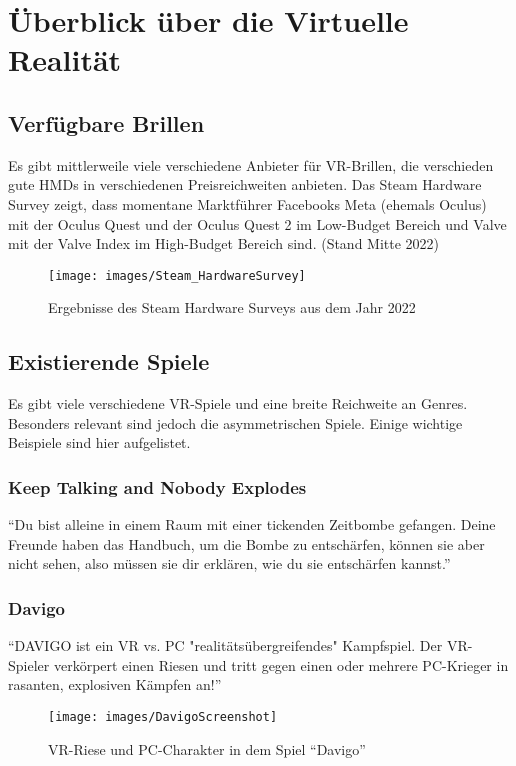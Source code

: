 \chapter{Überblick über die Virtuelle Realität}


\section{Verfügbare Brillen}
Es gibt mittlerweile viele verschiedene Anbieter für VR-Brillen, die verschieden gute HMDs in verschiedenen Preisreichweiten anbieten.
Das Steam Hardware Survey zeigt, dass momentane Marktführer Facebooks Meta (ehemals Oculus) mit der Oculus Quest und der Oculus Quest 2 im Low-Budget Bereich und Valve mit der Valve Index im High-Budget Bereich sind. (Stand Mitte 2022)


\begin{figure}[H]
	\centering
	\texttt{[image: images/Steam\_HardwareSurvey]}
	\caption{Ergebnisse des Steam Hardware Surveys aus dem Jahr 2022\cite{_steam_hardware}}
\end{figure}

\section{Existierende Spiele}
Es gibt viele verschiedene VR-Spiele und eine breite Reichweite an Genres. Besonders relevant sind jedoch die asymmetrischen Spiele. Einige wichtige Beispiele sind hier aufgelistet.

\subsection{Keep Talking and Nobody Explodes}
"`Du bist alleine in einem Raum mit einer tickenden Zeitbombe gefangen. Deine Freunde haben das Handbuch, um die Bombe zu entschärfen, können sie aber nicht sehen, also müssen sie dir erklären, wie du sie entschärfen kannst."'
\cite{_steam_keeptalking}

\subsection{Davigo}
"`DAVIGO ist ein VR vs. PC "realitätsübergreifendes" Kampfspiel. Der VR-Spieler verkörpert einen Riesen und tritt gegen einen oder mehrere PC-Krieger in rasanten, explosiven Kämpfen an!"'
\cite{_steam_davigo}

\begin{figure}[H]
	\centering
	\texttt{[image: images/DavigoScreenshot]}
	\caption{VR-Riese und PC-Charakter in dem Spiel "`Davigo"'\cite{_steam_davigo}}
\end{figure}

